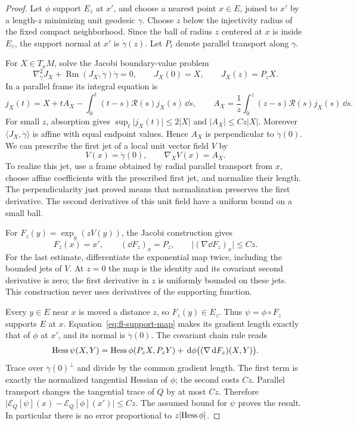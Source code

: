 \begin{proof}
Let \(\phi\) support \(E_z\) at \(x'\), and choose a nearest point
\(x\in E\), joined to \(x'\) by a length-\(z\) minimizing unit geodesic
\(\gamma\).  Choose \(z\) below the injectivity radius of the fixed
compact neighborhood.  Since the ball of radius \(z\) centered at
\(x\) is inside \(E_z\), the support normal at \(x'\) is
\(\dot\gamma(z)\).  Let \(P_t\) denote parallel transport along
\(\gamma\).

For \(X\in T_xM\), solve the Jacobi boundary-value problem
\[
 \nabla_{\dot\gamma}^2J_X+
       \operatorname{Rm}(J_X,\dot\gamma)\dot\gamma=0,\qquad
 J_X(0)=X,\qquad J_X(z)=P_zX.
\]
In a parallel frame its integral equation is
\[
 j_X(t)=X+tA_X-\int_0^t(t-s)\mathcal R(s)j_X(s)\,\dd s,\qquad
 A_X=\frac1z\int_0^z(z-s)\mathcal R(s)j_X(s)\,\dd s.
\]
For small \(z\), absorption gives
\(\sup_t\lvert j_X(t)\rvert\le2\lvert X\rvert\) and
\(\lvert A_X\rvert\le Cz\lvert X\rvert\).
Moreover \(\langle J_X,\dot\gamma\rangle\) is affine with equal endpoint
values.  Hence \(A_X\) is perpendicular to \(\dot\gamma(0)\).
We can prescribe the first jet of a local unit vector field \(V\) by
\[
 V(x)=\dot\gamma(0),\qquad \nabla_XV(x)=A_X .
\]
To realize this jet, use a frame obtained by radial parallel transport
from \(x\), choose affine coefficients with the prescribed first jet,
and normalize their length.  The perpendicularity just proved means
that normalization preserves the first derivative.  The second
derivatives of this unit field have a uniform bound on a small ball.

For \(F_z(y)=\exp_y(zV(y))\), the Jacobi construction gives
\begin{equation}
\label{eq:fl-support-map}
 F_z(x)=x',\qquad (\dd F_z)_x=P_z,\qquad
 \lvert(\nabla\dd F_z)_x\rvert\le Cz .
\end{equation}
For the last estimate, differentiate the exponential map twice,
including the bounded jets of \(V\).  At \(z=0\) the map is the identity
and its covariant second derivative is zero; the first derivative in
\(z\) is uniformly bounded on these jets.  This construction never
uses derivatives of the supporting function.

Every \(y\in E\) near \(x\) is moved a distance \(z\), so
\(F_z(y)\in E_z\).  Thus \(\psi=\phi\circ F_z\) supports \(E\) at \(x\).
Equation~\eqref{eq:fl-support-map} makes its gradient length exactly
that of \(\phi\) at \(x'\), and its normal is \(\dot\gamma(0)\).
The covariant chain rule reads
\[
 \operatorname{Hess}\psi(X,Y)=\operatorname{Hess}\phi(P_zX,P_zY)
       +\,\mathrm d\phi\bigl((\nabla\,\mathrm d F_z)(X,Y)\bigr).
\]
Trace over \(\dot\gamma(0)^\perp\) and divide by the common gradient
length.  The first term is exactly the normalized tangential Hessian
of \(\phi\); the second costs \(Cz\).  Parallel transport changes the
tangential trace of \(Q\) by at most \(Cz\).  Therefore
\(\lvert\mathcal E_Q[\psi](x)-\mathcal E_Q[\phi](x')\rvert\le Cz\).
The assumed bound for \(\psi\) proves the result.  In particular there
is no error proportional to \(z\lvert\operatorname{Hess}\phi\rvert\).
\end{proof}

